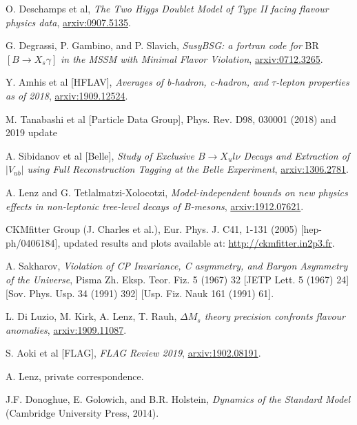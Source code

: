 \documentclass[a4paper,12pt]{article}
\begin{document}
\begin{thebibliography}{99}

O. Deschamps et al, \emph{The Two Higgs Doublet Model of Type II facing flavour physics data}, \href{https://arxiv.org/pdf/0907.5135.pdf}{arxiv:0907.5135}.

G. Degrassi, P. Gambino, and P. Slavich, \emph{SusyBSG: a fortran code for} BR$[B\to X_s\gamma]$ \emph{in the MSSM with Minimal Flavor Violation}, \href{https://arxiv.org/pdf/0712.3265.pdf}{arxiv:0712.3265}.

Y. Amhis et al [HFLAV], \emph{Averages of b-hadron, c-hadron, and $\tau$-lepton properties as of 2018}, \href{https://arxiv.org/pdf/1909.12524.pdf}{arxiv:1909.12524}.

M. Tanabashi et al [Particle Data Group], Phys. Rev. D98, 030001 (2018) and 2019 update

A. Sibidanov et al [Belle], \emph{Study of Exclusive $B\to X_ul\nu$ Decays and Extraction of $|V_{ub}|$ using Full Reconstruction Tagging at the Belle Experiment}, \href{https://arxiv.org/pdf/1306.2781.pdf}{arxiv:1306.2781}.

A. Lenz and G. Tetlalmatzi-Xolocotzi, \emph{Model-independent bounds on new physics effects in non-leptonic tree-level decays of B-mesons}, \href{https://arxiv.org/pdf/1912.07621.pdf}{arxiv:1912.07621}.

CKMfitter Group (J. Charles et al.), Eur. Phys. J. C41, 1-131 (2005) [hep-ph/0406184], updated results and plots available at: \href{http://ckmfitter.in2p3.fr}{http://ckmfitter.in2p3.fr}.

A. Sakharov, \emph{Violation of CP Invariance, C asymmetry, and Baryon Asymmetry of the Universe}, Pisma Zh. Eksp. Teor. Fiz. 5 (1967) 32 [JETP Lett. 5 (1967) 24] [Sov. Phys. Usp. 34 (1991) 392] [Usp. Fiz. Nauk 161 (1991) 61].

L. Di Luzio, M. Kirk, A. Lenz, T. Rauh, \emph{$\Delta M_s$ theory precision confronts flavour anomalies}, \href{https://arxiv.org/pdf/1909.11087.pdf}{arxiv:1909.11087}.

S. Aoki et al [FLAG], \emph{FLAG Review 2019}, \href{https://arxiv.org/pdf/1902.08191.pdf}{arxiv:1902.08191}.

A. Lenz, private correspondence.

J.F. Donoghue, E. Golowich, and B.R. Holstein, \emph{Dynamics of the Standard Model} (Cambridge University Press, 2014).


\end{thebibliography}
\end{document}
